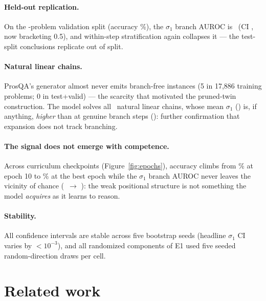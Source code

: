 \documentclass[11pt]{article}
\newcommand{\sigmaone}{\sigma_1}
\begin{document}
\paragraph{Held-out replication.} On the \nValidProblems-problem validation split
(accuracy \validAccPct\%), the $\sigmaone$ branch AUROC is \validAurocSigma\
(CI \validAurocSigmaCI, now bracketing 0.5), and within-step stratification again
collapses it --- the test-split conclusions replicate out of split.

\paragraph{Natural linear chains.} ProsQA's generator almost never emits
branch-free instances (5 in 17,886 training problems; 0 in test+valid) --- the
scarcity that motivated the pruned-twin construction. The model solves all
\natlinN\ natural linear chains, whose mean $\sigmaone$ (\natlinSigma) is, if
anything, \emph{higher} than at genuine branch steps (\natlinSigmaBranch): further
confirmation that expansion does not track branching.

\paragraph{The signal does not emerge with competence.} Across curriculum
checkpoints (Figure~\ref{fig:epochs}), accuracy climbs from \epochTenAccPct\% at
epoch 10 to \epochBestAccPct\% at the best epoch while the $\sigmaone$ branch AUROC
never leaves the vicinity of chance (\epochTenAuroc\ $\to$ \epochBestAuroc): the
weak positional structure is not something the model \emph{acquires} as it learns
to reason.

\paragraph{Stability.} All confidence intervals are stable across five bootstrap
seeds (headline $\sigmaone$ CI varies by $<10^{-3}$), and all randomized
components of E1 used five seeded random-direction draws per cell.

\section{Related work}
\label{sec:related}
\end{document}
